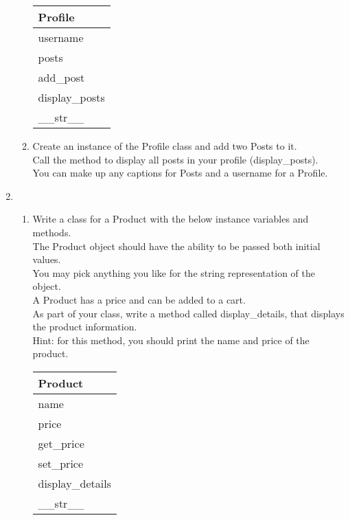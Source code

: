 \documentclass{article}
\begin{document}
\begin{enumerate}
\begin{enumerate}
			\begin{flushright}
			\begin{tabular}{|l|}
				\hline
				Profile\\ \hline  	%
				username\\ posts\\ \hline		%
				add\_post\\ display\_posts \\ \_\_str\_\_ \\ \hline		%
			\end{tabular}
			\end{flushright}

		\item
			Create an instance of the Profile class and add two Posts to it.\\
			Call the method to display all posts in your profile (display\_posts).\\
			You can make up any captions for Posts and a username for a Profile.\\
	\end{enumerate}
\pagebreak



	\item
	\begin{enumerate}
		\item
			Write a class for a Product with the below instance variables and methods.\\ 
			The Product object should have the ability to be passed both initial values.\\  
			You may pick anything you like for the string representation of the object.\\
			A Product has a price and can be added to a cart.\\  
			As part of your class, write a method called display\_details, that displays the product information.\\
			Hint: for this method, you should print the name and price of the product.
			\begin{flushright}
			\begin{tabular}{|l|}
				\hline
				Product\\ \hline
				name\\	price\\	 \hline
				get\_price \\ set\_price \\ display\_details \\ \_\_str\_\_ \\ \hline
			\end{tabular}
			\end{flushright}


\end{enumerate}
\end{enumerate}
\end{document}
